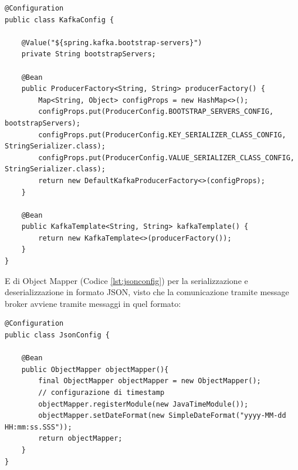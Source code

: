 \begin{lstlisting}[style=myJava, 
    caption={Classe di configurazione KafkaConfig.java}, label=lst:KafkaConfig, 
    emph={[2] BOOTSTRAP_SERVERS_CONFIG, KEY_SERIALIZER_CLASS_CONFIG ,  VALUE_SERIALIZER_CLASS_CONFIG, bootstrapServers },
    emphstyle={[2]\color{codeDarkMagenta}},]
@Configuration
public class KafkaConfig {

    @Value("${spring.kafka.bootstrap-servers}")
    private String bootstrapServers;

    @Bean
    public ProducerFactory<String, String> producerFactory() {
        Map<String, Object> configProps = new HashMap<>();
        configProps.put(ProducerConfig.BOOTSTRAP_SERVERS_CONFIG, bootstrapServers);
        configProps.put(ProducerConfig.KEY_SERIALIZER_CLASS_CONFIG, StringSerializer.class);
        configProps.put(ProducerConfig.VALUE_SERIALIZER_CLASS_CONFIG, StringSerializer.class);
        return new DefaultKafkaProducerFactory<>(configProps);
    }

    @Bean
    public KafkaTemplate<String, String> kafkaTemplate() {
        return new KafkaTemplate<>(producerFactory());
    }
}
\end{lstlisting}
E di Object Mapper (Codice \vref{lst:jsonconfig}) per la serializzazione e deserializzazione in formato JSON, visto che la comunicazione tramite message broker avviene tramite messaggi in quel formato:
\begin{lstlisting}[style=myJava, 
    caption={Classe di configurazione JsonConfig.java}, label=lst:jsonconfig,]
@Configuration
public class JsonConfig {

    @Bean
    public ObjectMapper objectMapper(){
        final ObjectMapper objectMapper = new ObjectMapper();
        // configurazione di timestamp
        objectMapper.registerModule(new JavaTimeModule());
        objectMapper.setDateFormat(new SimpleDateFormat("yyyy-MM-dd HH:mm:ss.SSS"));
        return objectMapper;
    }
}
\end{lstlisting}
